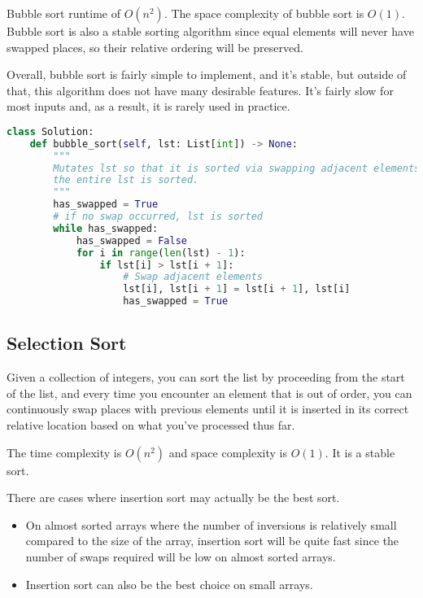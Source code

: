 Bubble sort runtime of \(O(n^{2})\).
The space complexity of bubble sort is \(O(1)\).
Bubble sort is also a stable sorting algorithm since equal elements will never have swapped places, so their relative ordering will be preserved.


Overall, bubble sort is fairly simple to implement, and it’s stable, but outside of that, this algorithm does not have many desirable features.
It’s fairly slow for most inputs and, as a result, it is rarely used in practice.



\begin{lstlisting}[language=python]
class Solution:
    def bubble_sort(self, lst: List[int]) -> None:
        """
        Mutates lst so that it is sorted via swapping adjacent elements until
        the entire lst is sorted.
        """
        has_swapped = True
        # if no swap occurred, lst is sorted
        while has_swapped:
            has_swapped = False
            for i in range(len(lst) - 1):
                if lst[i] > lst[i + 1]:
                    # Swap adjacent elements
                    lst[i], lst[i + 1] = lst[i + 1], lst[i]
                    has_swapped = True          
\end{lstlisting}

\subsection{Selection Sort}
\label{sec:selection-sort-1}

Given a collection of integers, you can sort the list by proceeding from the start of the list, and every time you encounter an element that is out of order, you can continuously swap places with previous elements until it is inserted in its correct relative location based on what you’ve processed thus far.

The time complexity is \(O(n^{2})\) and space complexity is \(O(1)\).
It is a stable sort.


There are cases where insertion sort may actually be the best sort.
\begin{itemize}
\item On almost sorted arrays where the number of inversions is relatively small compared to the size of the array, insertion sort will be quite fast since the number of swaps required will be low on almost sorted arrays.
\item Insertion sort can also be the best choice on small arrays.
\end{itemize}



